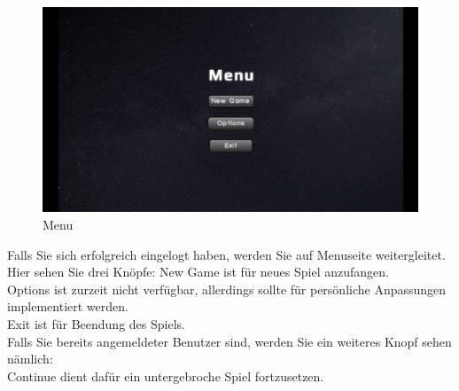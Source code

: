 \documentclass[fontsize=12pt,paper=a4,twoside]{scrartcl}
\begin{document}
\begin{figure}[htp]
	\centering
	\includegraphics[width=1.00\linewidth]{pics/menuscreen.png}
	\caption{Menu}
	\label{fig1}

\end{figure}
Falls Sie sich erfolgreich eingelogt haben, werden Sie auf Menuseite weitergleitet. Hier sehen Sie drei Knöpfe:
New Game ist für neues Spiel anzufangen. \\
Options ist zurzeit nicht verfügbar, allerdings sollte für persönliche Anpassungen implementiert werden. \\
Exit ist für Beendung des Spiels.\\
Falls Sie bereits angemeldeter Benutzer sind, werden Sie ein weiteres Knopf sehen nämlich: \\
Continue dient dafür ein untergebroche Spiel fortzusetzen.
\newpage
\end{document}
